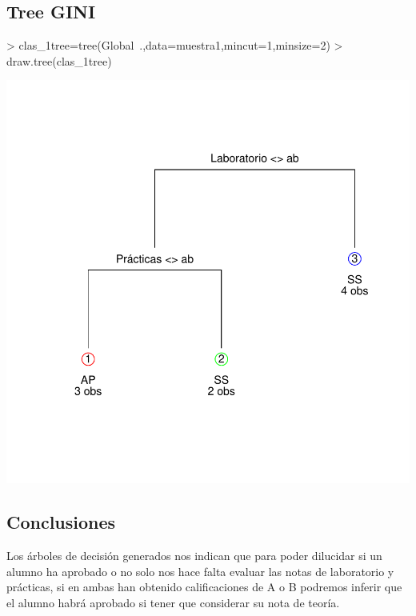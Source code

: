 \documentclass [a4paper] {article}
\begin{document}
\subsection{Tree GINI}
\begin{center}
\begin{Schunk}
\begin{Sinput}
> clas_1tree=tree(Global~.,data=muestra1,mincut=1,minsize=2) 
> draw.tree(clas_1tree)
\end{Sinput}
\end{Schunk}
\includegraphics{entrega-tree1}
\end{center}

\subsection{Conclusiones}
Los árboles de decisión generados nos indican que para poder dilucidar si un alumno ha aprobado o no solo nos hace falta evaluar las notas de laboratorio y prácticas,
si en ambas han obtenido calificaciones de A o B podremos inferir que el alumno habrá aprobado si tener que considerar su nota de teoría.

\newpage
\end{document}
